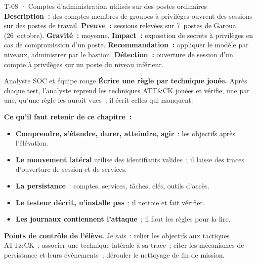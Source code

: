 \begin{boxobjet}{T-08 · Comptes d'administration utilisés sur des postes ordinaires}
\textbf{Description~:} des comptes membres de groupes à privilèges ouvrent
des sessions sur des postes de travail. \textbf{Preuve~:} sessions
relevées sur 7~postes de Garoua (26~octobre). \textbf{Gravité~:} moyenne.
\textbf{Impact~:} exposition de secrets à privilèges en cas de
compromission d'un poste. \textbf{Recommandation~:} appliquer le modèle par
niveaux, administrer par le bastion. \textbf{Détection~:} ouverture de
session d'un compte à privilèges sur un poste du niveau inférieur.
\end{boxobjet}

\begin{boxmetier}{Analyste SOC et équipe rouge}
\textbf{Écrire une règle par technique jouée.} Après chaque test, l'analyste
reprend les techniques ATT\&CK jouées et vérifie, une par une, qu'une règle
les aurait vues~; il écrit celles qui manquent.
\end{boxmetier}

\separateur

\begin{boxresume}
\textbf{Ce qu'il faut retenir de ce chapitre~:}
\begin{itemize}
    \item \textbf{Comprendre, s'étendre, durer, atteindre, agir}~: les
          objectifs après l'élévation.
    \item \textbf{Le mouvement latéral} utilise des identifiants valides~;
          il laisse des traces d'ouverture de session et de services.
    \item \textbf{La persistance}~: comptes, services, tâches, clés, outils
          d'accès.
    \item \textbf{Le testeur décrit, n'installe pas}~; il nettoie et fait
          vérifier.
    \item \textbf{Les journaux contiennent l'attaque}~; il faut les règles
          pour la lire.
\end{itemize}
\end{boxresume}

\begin{boxinfo}
\textbf{Points de contrôle de l'élève.} Je sais~: relier les objectifs aux
tactiques ATT\&CK~; associer une technique latérale à sa trace~; citer les
mécanismes de persistance et leurs événements~; dérouler le nettoyage de fin
de mission.
\end{boxinfo}

\bigskip

